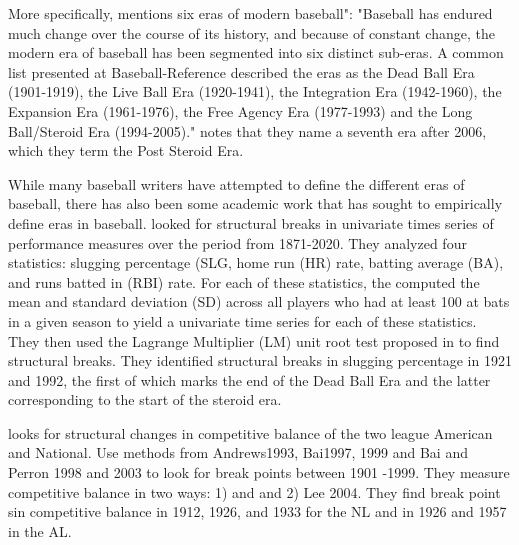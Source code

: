 \documentclass[USenglish]{article}
\theoremstyle{dgthm}
\theoremstyle{dgdef}
\begin{document}
More specifically, \cite{Woltring2018} mentions six eras of modern baseball": 
"Baseball has endured much change over the course of its history, and because of constant change, the modern era of baseball has been segmented into six distinct sub-eras. A common list presented at Baseball-Reference described the eras as the Dead Ball Era (1901-1919), the Live Ball Era (1920-1941), the Integration Era (1942-1960), the Expansion Era (1961-1976), the Free Agency Era (1977-1993) and the Long Ball/Steroid Era (1994-2005)."  \cite{Woltring2018} notes that they name a seventh era after 2006, which they term the Post Steroid Era.  

While many baseball writers have attempted to define the different eras of baseball, there has also been some academic work that has sought to empirically define eras in baseball.  \cite{Groothius2017} looked for structural breaks in univariate times series of performance measures over the period from 1871-2020.  They analyzed four statistics: slugging percentage (SLG, home run (HR) rate, batting average (BA), and runs batted in (RBI) rate.   For each of these statistics, the computed the mean and standard deviation (SD) across all players who had at least 100 at bats in a given season to yield a univariate time series for each of these statistics.  They then used the Lagrange Multiplier (LM) unit root test proposed in \cite{LeeandStrazicich2003} to find structural breaks.  They identified structural breaks in slugging percentage in 1921 and 1992, the first of which marks the end of the Dead Ball Era and the latter corresponding to the start of the steroid era. 

\cite{LeeFort2005} looks for structural changes in competitive balance of the two league American and National.  Use methods from Andrews1993, Bai1997, 1999 and Bai and Perron 1998 and 2003 to look for break points between 1901 -1999.  They measure competitive balance in two ways: 1) \cite{Noll1988} and \cite{Scully1989} and 2) Lee 2004. They find break point sin competitive balance in 1912, 1926, and 1933 for the NL and in 1926 and 1957 in the AL.  
\end{document}
